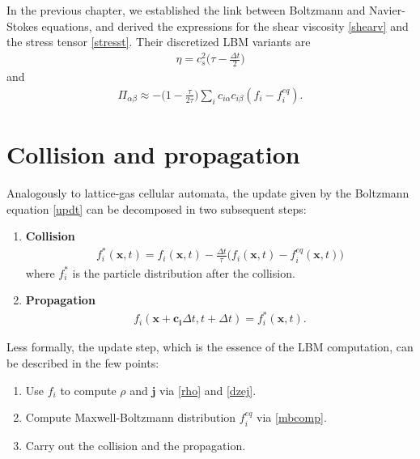 \bigskip

In the previous chapter, we established the link between Boltzmann and Navier-Stokes equations, and derived the expressions for the shear viscosity \ref{shearv} and the stress tensor \ref{stresst}. Their discretized LBM variants are
\begin{align*}
\eta = c_s^2 \big( \tau - \frac{\Delta t}{2} \big)
\end{align*}
and
\begin{align*}
\Pi_{\alpha \beta} \approx - \big( 1 - \frac{\tau}{2 \tau} \big) \sum_i c_{i\alpha} c_{i\beta}(f_i - f_i^{eq}).
\end{align*}

\section{Collision and propagation}
Analogously to lattice-gas cellular automata, the update given by the Boltzmann equation \ref{updt} can be decomposed in two subsequent steps:
\begin{enumerate}
\item \textbf{Collision}
\begin{align*}
f_i^*(\bm{x},t) = f_i(\bm{x},t) - \frac{\Delta t}{\tau}\big( f_i(\bm{x},t) - f_i^{eq}(\bm{x},t) \big)
\end{align*}
where $f_i^*$ is the particle distribution after the collision.
\item \textbf{Propagation}
\begin{align*}
f_i(\bm{x} + \bm{c_i} \Delta t, t + \Delta t) = f_i^*(\bm{x},t).
\end{align*}
\end{enumerate}

Less formally, the update step, which is the essence of the LBM computation, can be described in the few points:
\begin{enumerate}
\item Use $f_i$ to compute $\rho$ and $\bm{j}$ via \ref{rho} and \ref{dzej}.
\item Compute Maxwell-Boltzmann distribution $f_i^{eq}$ via \ref{mbcomp}.
\item Carry out the collision and the propagation.
\end{enumerate}